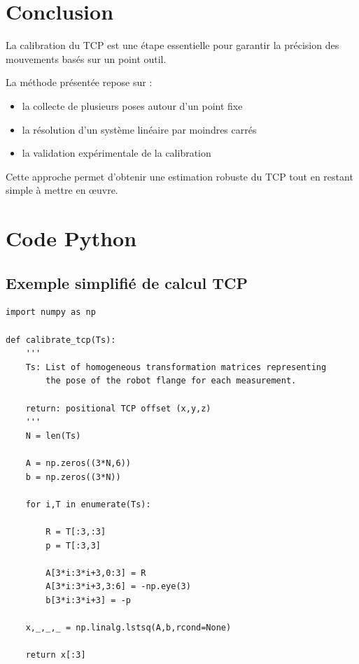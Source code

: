 \documentclass[a4paper,11pt]{article}
\begin{document}
\section{Conclusion}

La calibration du TCP est une étape essentielle pour garantir la précision des mouvements basés sur un point outil.

La méthode présentée repose sur :

\begin{itemize}
\item la collecte de plusieurs poses autour d’un point fixe
\item la résolution d’un système linéaire par moindres carrés
\item la validation expérimentale de la calibration
\end{itemize}

Cette approche permet d’obtenir une estimation robuste du TCP tout en restant simple à mettre en œuvre.

\newpage
\appendix

\section{Code Python}

\subsection{Exemple simplifié de calcul TCP}
\begin{lstlisting}
import numpy as np

def calibrate_tcp(Ts):
    '''
    Ts: List of homogeneous transformation matrices representing
        the pose of the robot flange for each measurement.

    return: positional TCP offset (x,y,z)
    '''
    N = len(Ts)

    A = np.zeros((3*N,6))
    b = np.zeros((3*N))

    for i,T in enumerate(Ts):

        R = T[:3,:3]
        p = T[:3,3]

        A[3*i:3*i+3,0:3] = R
        A[3*i:3*i+3,3:6] = -np.eye(3)
        b[3*i:3*i+3] = -p

    x,_,_,_ = np.linalg.lstsq(A,b,rcond=None)

    return x[:3]

\end{lstlisting}
\end{document}
